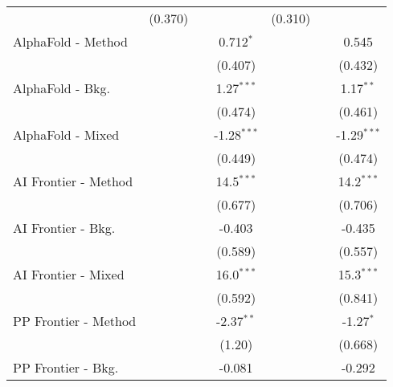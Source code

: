 \begin{tabular}{lcccccc}
                                  & (0.370)        &               &               & (0.310)        &               &   \\   
   AlphaFold - Method             &                &               & 0.712$^{*}$   &                &               & 0.545\\   
                                  &                &               & (0.407)       &                &               & (0.432)\\   
   AlphaFold - Bkg.               &                &               & 1.27$^{***}$  &                &               & 1.17$^{**}$\\   
                                  &                &               & (0.474)       &                &               & (0.461)\\   
   AlphaFold - Mixed              &                &               & -1.28$^{***}$ &                &               & -1.29$^{***}$\\   
                                  &                &               & (0.449)       &                &               & (0.474)\\   
   AI Frontier - Method           &                &               & 14.5$^{***}$  &                &               & 14.2$^{***}$\\   
                                  &                &               & (0.677)       &                &               & (0.706)\\   
   AI Frontier - Bkg.             &                &               & -0.403        &                &               & -0.435\\   
                                  &                &               & (0.589)       &                &               & (0.557)\\   
   AI Frontier - Mixed            &                &               & 16.0$^{***}$  &                &               & 15.3$^{***}$\\   
                                  &                &               & (0.592)       &                &               & (0.841)\\   
   PP Frontier - Method           &                &               & -2.37$^{**}$  &                &               & -1.27$^{*}$\\   
                                  &                &               & (1.20)        &                &               & (0.668)\\   
   PP Frontier - Bkg.             &                &               & -0.081        &                &               & -0.292\\   

\end{tabular}
